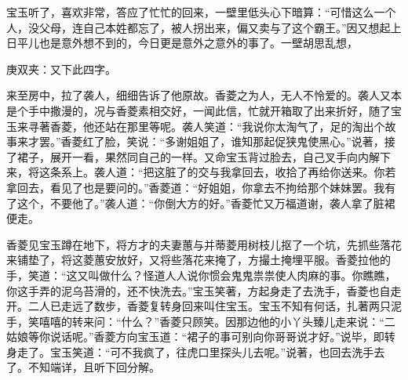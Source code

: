 \begin{parag}
    宝玉听了，喜欢非常，答应了忙忙的回来，一壁里低头心下暗算：“可惜这么一个人，没父母，连自己本姓都忘了，被人拐出来，偏又卖与了这个霸王。”因又想起上日平儿也是意外想不到的，今日更是意外之意外的事了。一壁胡思乱想，\begin{note}庚双夹：又下此四字。\end{note}来至房中，拉了袭人，细细告诉了他原故。香菱之为人，无人不怜爱的。袭人又本是个手中撒漫的，况与香菱素相交好，一闻此信，忙就开箱取了出来折好，随了宝玉来寻著香菱，他还站在那里等呢。袭人笑道：“我说你太淘气了，足的淘出个故事来才罢。”香菱红了脸，笑说：“多谢姐姐了，谁知那起促狭鬼使黑心。”说著，接了裙子，展开一看，果然同自己的一样。又命宝玉背过脸去，自己叉手向内解下来，将这条系上。袭人道：“把这脏了的交与我拿回去，收拾了再给你送来。你若拿回去，看见了也是要问的。”香菱道：“好姐姐，你拿去不拘给那个妹妹罢。我有了这个，不要他了。”袭人道：“你倒大方的好。”香菱忙又万福道谢，袭人拿了脏裙便走。
\end{parag}


\begin{parag}
    香菱见宝玉蹲在地下，将方才的夫妻蕙与并蒂菱用树枝儿抠了一个坑，先抓些落花来铺垫了，将这菱蕙安放好，又将些落花来掩了，方撮土掩埋平服。香菱拉他的手，笑道：“这又叫做什么？怪道人人说你惯会鬼鬼祟祟使人肉麻的事。你瞧瞧，你这手弄的泥乌苔滑的，还不快洗去。”宝玉笑著，方起身走了去洗手，香菱也自走开。二人已走远了数步，香菱复转身回来叫住宝玉。宝玉不知有何话，扎著两只泥手，笑嘻嘻的转来问：“什么？”香菱只顾笑。因那边他的小丫头臻儿走来说：“二姑娘等你说话呢。”香菱方向宝玉道：“裙子的事可别向你哥哥说才好。”说毕，即转身走了。宝玉笑道：“可不我疯了，往虎口里探头儿去呢。”说著，也回去洗手去了。不知端详，且听下回分解。
\end{parag}